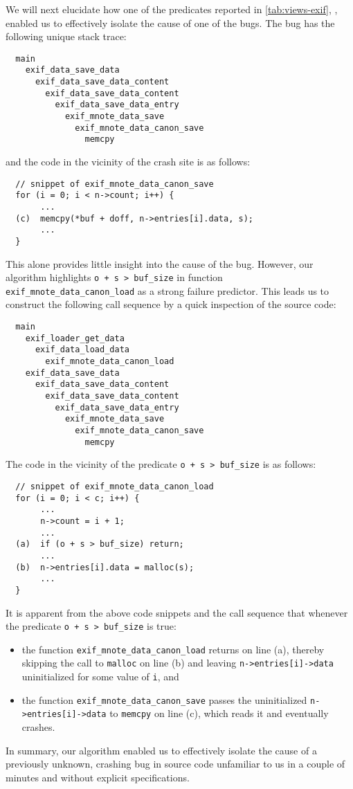 We will next elucidate how one of the predicates reported in \autoref{tab:views-exif},
\exifpred, enabled us to effectively isolate the cause of one of the bugs.
The bug has the following unique stack trace:
\begin{verbatim}
  main
    exif_data_save_data
      exif_data_save_data_content
        exif_data_save_data_content
          exif_data_save_data_entry
            exif_mnote_data_save
              exif_mnote_data_canon_save
                memcpy
\end{verbatim}
and the code in the vicinity of the crash site is as follows:
\begin{small}
\begin{verbatim}
  // snippet of exif_mnote_data_canon_save
  for (i = 0; i < n->count; i++) {
       ...
  (c)  memcpy(*buf + doff, n->entries[i].data, s);
       ...
  }
\end{verbatim}
\end{small}
This alone provides little insight into the cause of the bug.
However, our algorithm highlights {\tt o + s > buf\_size} in function
{\tt exif\_mnote\_data\_canon\_load} as a strong failure predictor.
This leads us to construct the following call sequence by a quick inspection of the
source code:
\begin{verbatim}
  main
    exif_loader_get_data 
      exif_data_load_data
        exif_mnote_data_canon_load
    exif_data_save_data
      exif_data_save_data_content
        exif_data_save_data_content
          exif_data_save_data_entry
            exif_mnote_data_save
              exif_mnote_data_canon_save
                memcpy
\end{verbatim}
The code in the vicinity of the predicate {\tt o + s > buf\_size} is as follows:
\begin{verbatim}
  // snippet of exif_mnote_data_canon_load
  for (i = 0; i < c; i++) {
       ...
       n->count = i + 1;
       ...
  (a)  if (o + s > buf_size) return;
       ...
  (b)  n->entries[i].data = malloc(s); 
       ...
  }
\end{verbatim}
It is apparent from the above code snippets and the
call sequence that whenever the predicate {\tt o + s > buf\_size} is true:
\begin{itemize}
\item
the function {\tt exif\_mnote\_data\_canon\_load} returns on line (a),
thereby skipping the call to {\tt malloc} on line (b) and leaving {\tt n->entries[i]->data}
uninitialized for some value of {\tt i}, and
\item
the function {\tt exif\_mnote\_data\_canon\_save} passes the uninitialized
{\tt n->entries[i]->data} to {\tt memcpy} on line (c), which reads it
and eventually crashes.
\end{itemize}
In summary, our algorithm enabled us to effectively isolate
the cause of a previously unknown, crashing bug in source code unfamiliar to us in
a couple of minutes and without explicit specifications.
